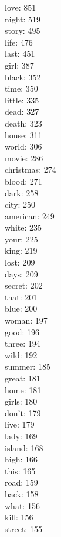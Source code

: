 \begin{multicols}{6}
  \noindent
  love: 851
  \\ night: 519
  \\ story: 495
  \\ life: 476
  \\ last: 451
  \\ girl: 387
  \\ black: 352
  \\ time: 350
  \\ little: 335
  \\ dead: 327
  \\ death: 323
  \\ house: 311
  \\ world: 306
  \\ movie: 286
  \\ christmas: 274
  \\ blood: 271
  \\ dark: 258
  \\ city: 250
  \\ american: 249
  \\ white: 235
  \\ your: 225
  \\ king: 219
  \\ lost: 209
  \\ days: 209
  \\ secret: 202
  \\ that: 201
  \\ blue: 200
  \\ woman: 197
  \\ good: 196
  \\ three: 194
  \\ wild: 192
  \\ summer: 185
  \\ great: 181
  \\ home: 181
  \\ girls: 180
  \\ don't: 179
  \\ live: 179
  \\ lady: 169
  \\ island: 168
  \\ high: 166
  \\ this: 165
  \\ road: 159
  \\ back: 158
  \\ what: 156
  \\ kill: 156
  \\ street: 155

\end{multicols}
